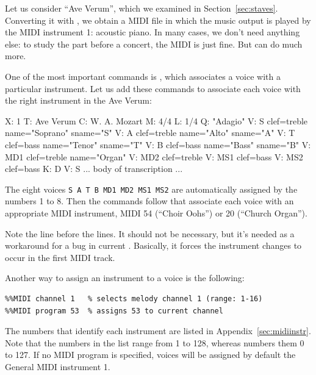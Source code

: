 \documentclass[a4paper,fullpage,12pt]{book}
\begin{document}
Let us consider ``Ave Verum'', which we examined in
Section~\ref{sec:staves}. Converting it with \abcmid, we obtain a MIDI
file in which the music output is played by the MIDI instrument 1:
acoustic piano. In many cases, we don't need anything else: to study
the part before a concert, the MIDI is just fine. But \abcmid{} can do
much more.

One of the most important \abcmid{} commands is , which associates a voice with a particular instrument. Let
us add these commands to associate each voice with the right
instrument in the Ave Verum:

\begin{abcsource}
X: 1
T: Ave Verum
C: W. A. Mozart
M: 4/4
L: 1/4
Q: "Adagio"
V: S clef=treble name="Soprano" sname="S"
V: A clef=treble name="Alto" sname="A"
V: T clef=bass name="Tenor" sname="T"
V: B clef=bass name="Bass" sname="B"
V: MD1 clef=treble name="Organ"
V: MD2 clef=treble
V: MS1 clef=bass
V: MS2 clef=bass
K: D
%
V: S %
... body of transcription ...
\end{abcsource}

The eight voices \texttt{S A T B MD1 MD2 MS1 MS2} are automatically
assigned by \abcmid{} the numbers 1 to 8. Then the  commands follow that associate each voice with an appropriate
MIDI instrument, MIDI 54 (``Choir Oohs'') or 20 (``Church Organ'').

Note the  line before the  lines. It
should not be necessary, but it's needed as a workaround for a bug in
current \abcmid. Basically, it forces the instrument changes to occur
in the first MIDI track.

Another way to assign an instrument to a voice is the following:

\begin{verbatim}
%%MIDI channel 1   % selects melody channel 1 (range: 1-16)
%%MIDI program 53  % assigns 53 to current channel
\end{verbatim}

The numbers that identify each instrument are listed in
Appendix~\ref{sec:midiinstr}. Note that the numbers in the list range from
1 to 128, whereas \abcmid{} numbers them 0 to 127.  If no MIDI program is
specified, voices will be assigned by default the General MIDI instrument
1.
\end{document}
